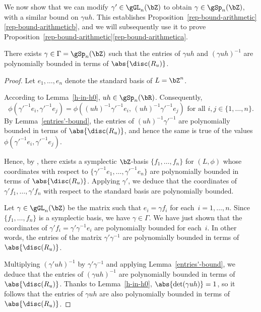 We now show that we can modify $\gamma' \in \gGL_n(\bZ)$ to obtain $\gamma \in \gSp_n(\bZ)$, with a similar bound on $\gamma uh$. This establishes Proposition~\ref{rep-bound-arithmetic}\eqref{rep-bound-arithmeticb}, and we will subsequently use it to prove Proposition~\ref{rep-bound-arithmetic}\eqref{rep-bound-arithmetica}.

\begin{lemma} \label{entries-bound}
There exists $\gamma \in \Gamma = \gSp_n(\bZ)$ such that the entries of $\gamma uh$ and $(\gamma uh)^{-1}$ are polynomially bounded in terms of $\abs{\disc(R_u)}$.
\end{lemma}

\begin{proof}
Let $e_1, \dotsc, e_n$ denote the standard basis of $L = \bZ^n$.

According to Lemma~\ref{h-in-h0}, $uh \in \gSp_n(\bR)$.
Consequently,
\[
\phi(\gamma'^{-1} e_i, \gamma'^{-1} e_j) = \phi((uh)^{-1}\gamma'^{-1} e_i, \, (uh)^{-1} \gamma'^{-1} e_j) \text{ for all } i, j \in \{ 1, \dotsc, n \}.
\]
By Lemma~\ref{entries'-bound}, the entries of $(uh)^{-1} \gamma'^{-1}$ are polynomially bounded in terms of $\abs{\disc(R_u)}$, and hence the same is true of the values $\phi(\gamma'^{-1} e_i, \gamma'^{-1} e_j)$.

Hence, by \cite[Lem.\,4.3]{Orr15}, there exists a symplectic $\bZ$-basis $\{ f_1, \dotsc, f_n \}$ for $(L, \phi)$ whose coordinates with respect to $\{ \gamma'^{-1}e_1, \dotsc, \gamma'^{-1}e_n \}$ are polynomially bounded in terms of $\abs{\disc(R_u)}$.
Applying $\gamma'$, we deduce that the coordinates of $\gamma' f_1, \dotsc, \gamma' f_n$ with respect to the standard basis are polynomially bounded.

Let $\gamma \in \gGL_n(\bZ)$ be the matrix such that $e_i = \gamma f_i$ for each~$i = 1, \dotsc, n$.
Since $\{ f_1, \dotsc, f_n \}$ is a symplectic basis, we have $\gamma \in \Gamma$.
We have just shown that the coordinates of $\gamma' f_i = \gamma' \gamma^{-1} e_i$ are polynomially bounded for each~$i$.
In other words, the entries of the matrix $\gamma' \gamma^{-1}$ are polynomially bounded in terms of $\abs{\disc(R_u)}$.

Multiplying $(\gamma'uh)^{-1}$ by $\gamma' \gamma^{-1}$ and applying Lemma~\ref{entries'-bound}, we deduce that the entries of $(\gamma uh)^{-1}$ are polynomially bounded in terms of $\abs{\disc(R_u)}$.
Thanks to Lemma~\ref{h-in-h0}, $\abs{\det(\gamma uh)} = 1$,
so it follows that the entries of $\gamma uh$ are also polynomially bounded in terms of $\abs{\disc(R_u)}$.
\end{proof}

